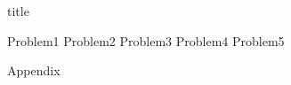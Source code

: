 \documentclass{article}
\begin{document}
{title}

\frontmatter

\tableofcontents

\listoffigures
\listoftables

\mainmatter

{Problem1}
{Problem2}
{Problem3}
{Problem4}
{Problem5}

\newpage
\printbibliography[heading = bibintoc, title = Bibliography] %
\addappendix
{Appendix}

\end{document}
